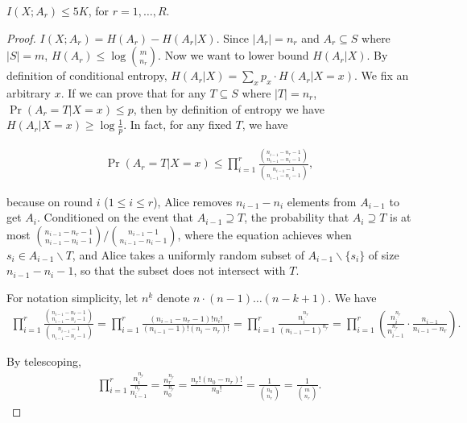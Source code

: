 \begin{lemma}\label{lemma:mutual-entropy-bound}
  $I(X;A_r)\le 5K$, for $r=1,\ldots, R$.
\end{lemma}

\begin{proof}
  $I(X;A_r)=H(A_r)-H(A_r|X)$. Since $|A_r|=n_r$ and $A_r\subseteq S$ where $|S|=m$, $H(A_r)\le \log {m \choose n_r}$. Now we want to lower bound $H(A_r|X)$. By definition of conditional entropy, $H(A_r|X)=\sum_x{p_x\cdot H(A_r|X=x)}$. We fix an arbitrary $x$. If we can prove that for any $T\subseteq S$ where $|T|=n_r$, $\Pr(A_r=T|X=x)\le p$, then by definition of entropy we have $H(A_r|X=x)\ge\log\frac{1}{p}$. In fact, for any fixed $T$, we have
  
  \begin{align}
    \Pr(A_r=T|X=x)\le \prod_{i=1}^{r}{\frac{{n_{i-1}-n_r-1 \choose n_{i-1}-n_i-1}}{{n_{i-1}-1 \choose n_{i-1}-n_i-1}}},
  \end{align}
  
  because on round $i$ ($1\le i \le r$), Alice removes $n_{i-1}-n_i$ elements from $A_{i-1}$ to get $A_i$. Conditioned on the event that $A_{i-1}\supseteq T$, the probability that $A_i\supseteq T$ is at most ${{n_{i-1}-n_r-1 \choose n_{i-1}-n_i-1}}/{{n_{i-1}-1 \choose n_{i-1}-n_i-1}}$, where the equation achieves when $s_i\in A_{i-1}\backslash T$, and Alice takes a uniformly random subset of $A_{i-1}\backslash \{s_i\}$ of size $n_{i-1}-n_i-1$, so that the subset does not intersect with $T$.
  
  For notation simplicity, let $n^{\underline{k}}$ denote $n\cdot (n-1)\ldots (n-k+1)$. We have 
  \begin{align}
    \prod_{i=1}^{r}{\frac{{n_{i-1}-n_r-1 \choose n_{i-1}-n_i-1}}{{n_{i-1}-1 \choose n_{i-1}-n_i-1}}}
    =\prod_{i=1}^{r}\frac{(n_{i-1}-n_r-1)!n_i!}{(n_{i-1}-1)!(n_i-n_r)!}
    =\prod_{i=1}^{r}\frac{n_i^{\underline{n_r}}}{(n_{i-1}-1)^{\underline{n_r}}}
    =\prod_{i=1}^{r} \left( \frac{n_i^{\underline{n_r}}}{n_{i-1}^{\underline{n_r}}}\cdot \frac{n_{i-1}}{n_{i-1}-n_r} \right).
  \end{align}
  
  By telescoping,
  \begin{align}
    \prod_{i=1}^{r} \frac{n_i^{\underline{n_r}}}{n_{i-1}^{\underline{n_r}}}
    =\frac{n_r^{\underline{n_r}}}{n_0^{\underline{n_r}}}
    =\frac{n_r!(n_0-n_r)!}{n_0!}=\frac{1}{{n_0 \choose n_r}}
    =\frac{1}{{m \choose n_r}}.
  \end{align}
  

\end{proof}
